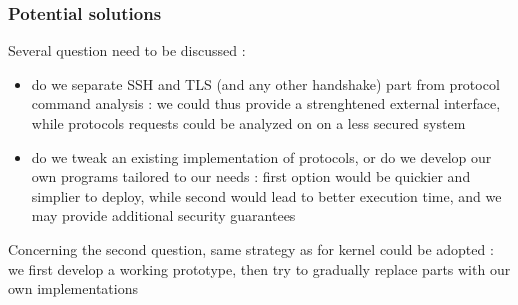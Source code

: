 \documentclass{beamer}
\begin{document}
\begin{frame}
\frametitle{Potential solutions}

Several question need to be discussed :

\begin{itemize}
\item do we separate SSH and TLS (and any other handshake) part from protocol command analysis : we could thus provide a strenghtened external interface, while protocols requests could be analyzed on on a less secured system
\item do we tweak an existing implementation of protocols, or do we develop our own programs tailored to our needs : first option would be quickier and simplier to deploy, while second would lead to better execution time, and we may provide additional security guarantees

\end{itemize}

Concerning the second question, same strategy as for kernel could be adopted : we first develop a working prototype, then try to gradually replace parts with our own implementations

\end{frame}
\end{document}
